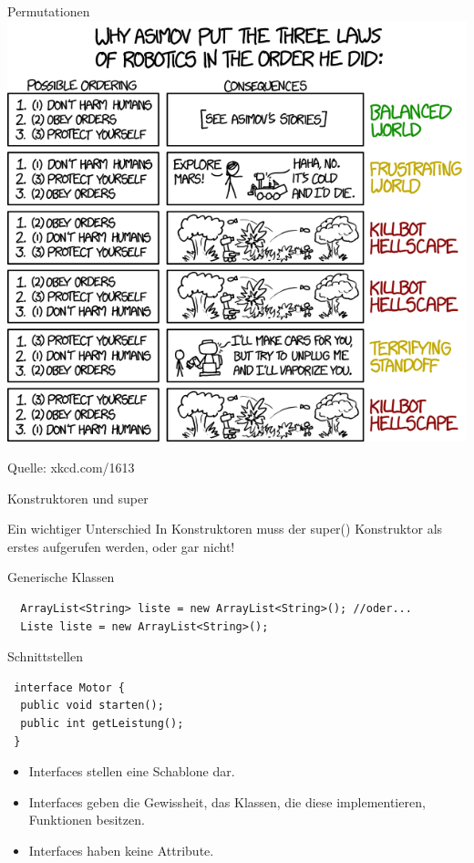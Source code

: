 \documentclass[18pt]{beamer}
\begin{document}
\begin{frame}{Permutationen}
 \pause \includegraphics[scale=0.4]{the_three_laws_of_robotics}
 
 \tiny{Quelle: xkcd.com/1613}
\end{frame}



\begin{frame}{Konstruktoren und super}
 \begin{alertblock}{Ein wichtiger Unterschied}
  In Konstruktoren muss der super() Konstruktor als erstes aufgerufen werden,
  oder gar nicht!
 \end{alertblock}
\end{frame}


\begin{frame}[fragile]{Generische Klassen}
 \begin{lstlisting}
  ArrayList<String> liste = new ArrayList<String>(); //oder...
  Liste liste = new ArrayList<String>();
 \end{lstlisting}
\end{frame}


\begin{frame}[fragile]{Schnittstellen}
\begin{lstlisting}
 interface Motor {
  public void starten();
  public int getLeistung();
 }
 \end{lstlisting}
 \begin{itemize}
  \item Interfaces stellen eine Schablone dar.
  \item Interfaces geben die Gewissheit, das Klassen, die diese implementieren, Funktionen besitzen.
  \item Interfaces haben keine Attribute.
 \end{itemize}

\end{frame}
\end{document}
